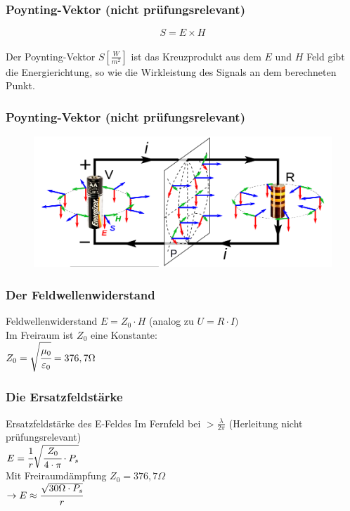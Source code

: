\begin{frame}
  \frametitle{Poynting-Vektor (nicht prüfungsrelevant)}
  \begin{center}
    \huge $$S = E \times H$$ \\[1em]
    \large Der Poynting-Vektor $S[\frac{W}{m^2}]$ ist das Kreuzprodukt aus dem $E$ und $H$ Feld gibt die Energierichtung, so wie die Wirkleistung des Signals an dem berechneten Punkt.
  \end{center}
\end{frame}

\begin{frame}
  \frametitle{Poynting-Vektor (nicht prüfungsrelevant)}
  \begin{center}
    \begin{figure}
      \includegraphics[width=1\textwidth,height=.75\textheight,keepaspectratio]{a08/Poynting_vectors_of_DC_circuit.png}
    \end{figure}
  \end{center}
\end{frame}

\begin{frame}
  \frametitle{Der Feldwellenwiderstand}
  \begin{block}{Feldwellenwiderstand}
    $E = Z_0 \cdot H$ \hspace{2cm} (analog zu $U = R \cdot I)$ \\[1em]
    Im Freiraum ist $Z_0$ eine Konstante: \\[1em]
    $Z_0 = \sqrt{\cfrac{\mu_0}{\varepsilon_0}} = 376,7 \Omega$ \\[1em]
  \end{block}
\end{frame}

\begin{frame}
  \frametitle{Die Ersatzfeldstärke}
  \begin{block}{Ersatzfeldstärke des E-Feldes}
    Im Fernfeld bei $> \frac{\lambda}{2\pi}$ (Herleitung nicht prüfungsrelevant)\\[1em]
    $E = \cfrac{1}{r} \sqrt{\cfrac{Z_0}{4 \cdot \pi} \cdot P_s}$ \\[1em]
    Mit Freiraumdämpfung $Z_0 = 376,7 \Omega $\\[1em]
    $\rightarrow E \approx \cfrac{\sqrt{30 \Omega \cdot P_s}}{r} $ \\[1em]
  \end{block}
\end{frame}

